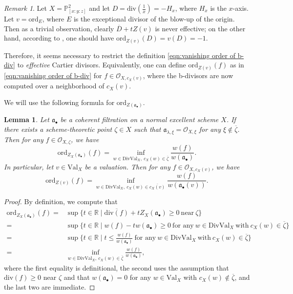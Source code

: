 \documentclass[11pt, leqno]{amsart}%
\theoremstyle{plain}
\newtheorem{lemma}[theorem]{Lemma}
\theoremstyle{definition}
\theoremstyle{remark}
\newtheorem{remark}[theorem]{Remark}
\newcommand{\cO}{\mathcal{O}}
\newcommand{\bP}{\mathbb{P}}
\newcommand{\bR}{\mathbb{R}}
\newcommand{\fa}{\mathfrak{a}}
\newcommand{\ord}{\mathrm{ord}}
\newcommand{\Val}{\mathrm{Val}}
\newcommand{\DivVal}{\mathrm{DivVal}}
\begin{document}
\begin{remark}\label{rmk:domain for definition of vanishing order}
    Let $X=\bP^2_{[x:y:z]}$ and let $D=\mathrm{div}(\frac{1}{x})=-H_x$, where $H_x$ is the $x$-axis. Let $v=\ord_E$, where $E$ is the exceptional divisor of the blow-up of the origin. 
    Then as a trivial observation, clearly $\overline D+tZ(v)$ is never effective; on the other hand, according to \cite[Proposition 3.17]{RU-b-div}, one should have $\ord_{Z(v)}(D)=v(D)=-1$.

    Therefore, it seems necessary to restrict the definition \eqref{eqn:vanishing order of b-div} to \emph{effective} Cartier divisors.
    Equivalently, one can define $\ord_{Z(v)}(f)$ as in \eqref{eqn:vanishing order of b-div} for $f\in \cO_{X,c_X(v)}$, where the b-divisors are now computed over a neighborhood of $c_X(v)$.  
\end{remark}

We will use the following formula for $\ord_{Z(\fa_\bullet)}$. 

\begin{lemma}\label{lem:filt rewriten}
    Let $\fa_\bullet$ be a coherent filtration on a normal excellent scheme $X$. If there exists a scheme-theoretic point $\zeta\in X$ such that $\fa_{\lambda,\xi}=\cO_{X,\xi}$ for any $\xi\notin\overline{\zeta}$. Then for any $f\in \cO_{X,\zeta}$, we have
    \[
        \ord_{Z_X(\fa_\bullet)}(f)=\inf_{w\in\DivVal_X,~c_X(w)\in\overline{\zeta}} \frac{w(f)}{w(\fa_\bullet)}.
    \]
    In particular, let $v\in\Val_X$ be a valuation. Then for any $f\in \cO_{X,c_X(v)}$, we have
    \[
        \ord_{Z(v)}(f)=\inf_{w\in\DivVal_X,~c_X(w)\in\overline{c_X(v)}} \frac{w(f)}{w(\fa_\bullet(v))}.
    \]
\end{lemma}

\begin{proof}
    By definition, we compute that
    \begin{equation*}
    \begin{aligned}
        \ord_{Z_X(\fa_\bullet)}(f)=&\sup\{t\in\bR\mid \overline{\mathrm{div}(f)}+t Z_X(\fa_\bullet)\ge 0~\text{near}~\zeta\}\\
            =&\sup\{t\in\bR\mid w(f)-t w(\fa_\bullet)\ge 0~\text{for any}~ w\in\DivVal_X~\text{with}~ c_X(w)\in\overline{\zeta}\}\\
            =&\sup\{t\in\bR\mid t\le \frac{w(f)}{w(\fa_\bullet)}~\text{for any}~ w\in\DivVal_X~\text{with}~ c_X(w)\in\overline{\zeta}\}\\
            =&\inf_{w\in\DivVal_X,~c_X(w)\in\overline{\zeta}} \frac{w(f)}{w(\fa_\bullet)},
    \end{aligned}
    \end{equation*}
    where the first equality is definitional, the second uses the assumption that $\mathrm{div}(f)\ge 0$ near $\zeta$ and that $w(\fa_\bullet)=0$ for any $w\in\Val_X$ with $c_X(w)\notin\overline{\zeta}$, and the last two are immediate.
\end{proof}
\end{document}
